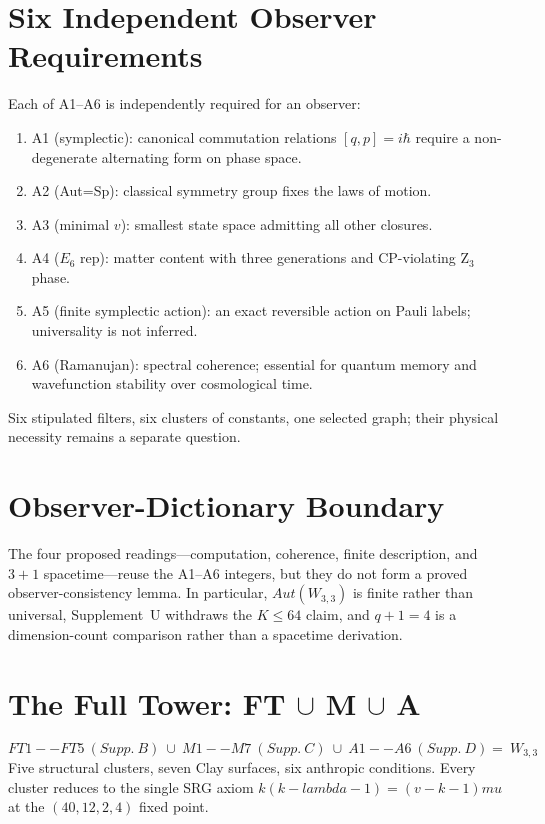 \documentclass[12pt,a4paper]{article}
\def\mathrm#1{#1}%
\def\textbf#1{#1}%
\def\text#1{#1}%
\def\lambda{lambda}%
\def\mu{mu}%
\theoremstyle{definition}
\newcommand{\Aut}{\mathrm{Aut}}
\begin{document}
\section*{Six Independent Observer Requirements}
Each of A1--A6 is independently required for an observer:
\begin{enumerate}[leftmargin=2em]
\item \textbf{A1 (symplectic):} canonical commutation relations
$[q,p]=i\hbar$ require a non-degenerate alternating form on phase space.
\item \textbf{A2 (Aut=Sp):} classical symmetry group fixes the laws of
motion.
\item \textbf{A3 (minimal $v$):} smallest state space admitting all
other closures.
\item \textbf{A4 ($E_6$ rep):} matter content with three generations
and CP-violating Z$_3$ phase.
\item \textbf{A5 (finite symplectic action):} an exact reversible
action on Pauli labels; universality is not inferred.
\item \textbf{A6 (Ramanujan):} spectral coherence; essential for
quantum memory and wavefunction stability over cosmological time.
\end{enumerate}
Six stipulated filters, six clusters of constants, one selected graph;
their physical necessity remains a separate question.

\section*{Observer-Dictionary Boundary}
The four proposed readings---computation, coherence, finite
description, and $3+1$ spacetime---reuse the A1--A6 integers, but they
do not form a proved observer-consistency lemma.  In particular,
$\Aut(W_{3,3})$ is finite rather than universal, Supplement~U
withdraws the $K\le64$ claim, and $q+1=4$ is a dimension-count
comparison rather than a spacetime derivation.

\section*{The Full Tower: FT $\cup$ M $\cup$ A}
\[
\text{FT1--FT5}\ (\text{Supp.\ B})\ \cup\ \text{M1--M7}\ (\text{Supp.\ C})\ \cup\ \text{A1--A6}\ (\text{Supp.\ D}) = \boxed{\ W_{3,3}\ }
\]
Five structural clusters, seven Clay surfaces, six anthropic
conditions. \textbf{Every} cluster reduces to the single SRG axiom
$k(k-\lambda-1)=(v-k-1)\mu$ at the $(40,12,2,4)$ fixed point.
\end{document}

